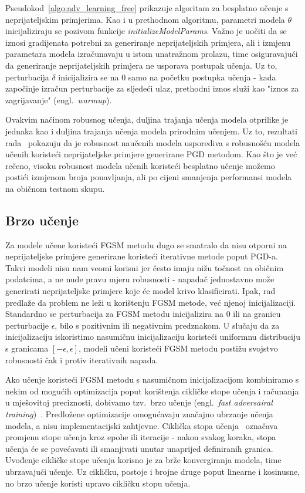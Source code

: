 \documentclass[times, utf8, zavrsni, numeric]{fer}
\begin{document}
Pseudokod~\ref{algo:adv_learning_free} prikazuje algoritam za besplatno učenje s neprijateljskim primjerima.
Kao i u prethodnom algoritmu, parametri modela $\theta$ inicijaliziraju se pozivom funkcije \textit{initializeModelParams}.
Važno je uočiti da se iznosi gradijenata potrebni za generiranje neprijateljskih primjera, ali i izmjenu parametara modela izračunavaju u istom unatražnom prolazu,
time osiguravajući da generiranje neprijateljskih primjera ne usporava postupak učenja. 
Uz to, perturbacija $\delta$ inicijalizira se na 0 samo na početku postupka učenja - kada započinje izračun perturbacije za sljedeći ulaz, prethodni iznos služi kao "iznos za zagrijavanje" (engl.\ \textit{warmup}).

Ovakvim načinom robusnog učenja, duljina trajanja učenja modela otprilike je jednaka kao i duljina trajanja učenja modela prirodnim učenjem.
Uz to, rezultati rada~\cite{shafahi2019adversarial} pokazuju da je robusnost naučenih modela usporediva s robusnošću modela učenih koristeći neprijateljske primjere generirane PGD metodom.
Kao što je već rečeno, visoku robusnost modela učenih koristeći besplatno učenje možemo postići izmjenom broja ponavljanja, ali po cijeni smanjenja performansi modela na običnom testnom skupu.

\subsection{Brzo učenje}

Za modele učene koristeći FGSM metodu dugo se smatralo da nisu otporni na neprijateljske primjere generirane koristeći iterativne metode poput PGD-a.
Takvi modeli nisu nam veomi korisni jer često imaju nižu točnost na običnim podatcima, a ne nude pravu mjeru robusnosti - napadač jednostavno može generirati neprijateljske primjere koje će model krivo klasificirati.
Ipak, rad~\cite{wong2020fast} predlaže da problem ne leži u korištenju FGSM metode, već njenoj inicijalizaciji.
Standardno se perturbacija za FGSM metodu inicijalizira na 0 ili na granicu perturbacije $\epsilon$, bilo s pozitivnim ili negativnim predznakom.
U slučaju da za inicijalizaciju iskoristimo nasumičnu inicijalizaciju koristeći uniformnu distribuciju s granicama $[-\epsilon, \epsilon]$, 
modeli učeni koristeći FGSM metodu postižu svojstvo robusnosti čak i protiv iterativnih napada.

Ako učenje koristeći FGSM metodu s nasumičnom inicijalizacijom kombiniramo s nekim od mogućih optimizacija poput korištenja cikličke stope učenja i računanja u mješovitoj preciznosti,
dobivamo tzv.\ brzo učenje (engl.\ \textit{fast adversairal training})~\cite{wong2020fast}. Predložene optimizacije omogućavaju značajno ubrzanje učenja modela, a nisu implementacijski zahtjevne.
Ciklička stopa učenja~\cite{smith2017cyclical} označava promjenu stope učenja kroz epohe ili iteracije - nakon svakog koraka, stopa učenja će se povećavati ili smanjivati unutar unaprijed definiranih granica.
Uvođenje cikličke stope učenja korisno je za brže konvergiranja modela, time ubrzavajući učenje. 
Uz cikličku, postoje i brojne druge poput linearne i kosinusne, no brzo učenje koristi upravo cikličku stopu učenja.
\end{document}
